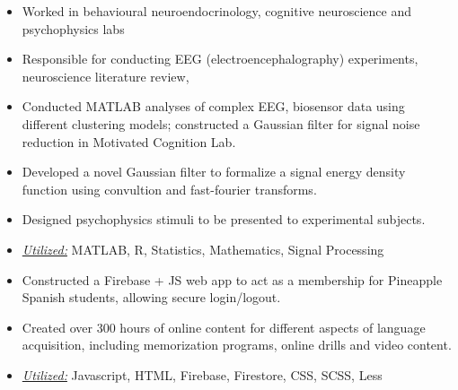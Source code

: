 \documentclass[10pt,a4paper,ragged2e]{altacv}
\begin{document}
\begin{itemize}
\item Worked in behavioural neuroendocrinology, cognitive neuroscience and psychophysics labs
\item Responsible for conducting EEG (electroencephalography) experiments, neuroscience literature review,
\item Conducted MATLAB analyses of complex EEG, biosensor data using different clustering models; constructed a Gaussian filter for signal noise reduction in Motivated Cognition Lab.
\end{itemize} 
\divider\small


\begin{itemize}
  \item Developed a novel Gaussian filter to formalize a signal energy density function using convultion and fast-fourier transforms.
  \item Designed psychophysics stimuli to be presented to experimental subjects.
  \item \underline{\textit{Utilized:}} MATLAB, R, Statistics, Mathematics, Signal Processing
\end{itemize}
\divider\small

\begin{itemize}
  \item Constructed a Firebase + JS web app to act as a membership for Pineapple Spanish students, allowing secure login/logout.
  \item Created over 300 hours of online content for different aspects of language acquisition, including memorization programs, online drills and video content.
  \item \underline{\textit{Utilized:}} Javascript, HTML, Firebase, Firestore, CSS, SCSS, Less
\end{itemize}
\divider\small
\end{document}
